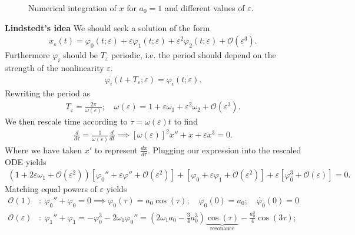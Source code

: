 \begin{ex}
\begin{figure}[h!]
	\caption{Numerical integration of $x$ for $a_0=1$ and different values of $\varepsilon$.}
	\label{fig:effect_nonlin_springboard}
\end{figure}

\noindent
\textbf{Lindstedt's idea} We should seek a solution of the form
\begin{align}
	x_{\varepsilon}(t) = \varphi_0(t;\varepsilon) + \varepsilon \varphi_1 (t;\varepsilon) + \varepsilon^2 \varphi_2(t;\varepsilon) + \mathcal{O}(\varepsilon^3).
\end{align}
Furthermore $\varphi_i$ should be $T_\varepsilon$ periodic, i.e. the period should depend on the strength of the  nonlinearity $\varepsilon$.
\begin{align}
	\varphi_i(t+T_\varepsilon; \varepsilon) = \varphi_i(t;\varepsilon).
\end{align}
Rewriting the period as
\begin{align}
	T_\varepsilon = \frac{2 \pi }{\omega(\varepsilon)}; \quad \omega(\varepsilon) = 1 + \varepsilon \omega_1 + \varepsilon^2 \omega_2 + \mathcal{O}(\varepsilon^3).
\end{align}
We then rescale time according to $\tau = \omega(\varepsilon) t$ to find
\begin{align}
	\frac{d}{d\tau} = \frac{1}{\omega(\varepsilon)} \frac{d}{dt} \implies 
	\boxed{[\omega(\varepsilon)]^2 x'' + x + \varepsilon x^3 = 0.}
\end{align}
Where we have taken $x'$ to represent $\frac{dx}{d\tau}$. Plugging our expression into the rescaled ODE yields
\begin{align}
	\left( 1 + 2 \varepsilon \omega_1 + \mathcal{O}(\varepsilon^2) \right) \left[ \varphi_0'' + \varepsilon \varphi'' + \mathcal{O}(\varepsilon^2) \right] + \left[ \varphi_0 + \varepsilon \varphi_1 + \mathcal{O}(\varepsilon^2) \right] + \varepsilon \left[\varphi_0^{3} + \mathcal{O}(\varepsilon) \right] = 0.
\end{align}
Matching equal powers of $\varepsilon$ yields
\begin{subequations}\begin{align}
	\mathcal{O}(1)&:\ \varphi_0'' + \varphi_0 = 0 \implies \varphi_0(\tau) = a_0 \cos(\tau);\quad \varphi_0(0)=a_0;\quad \dot{\varphi_0}(0) = 0 \\
	\mathcal{O}(\varepsilon)&:\ \varphi_1'' + \varphi_1 = - \varphi^3_0 - 2\omega_1 \varphi_{0}'' = 
	\left(2 \omega_1 a_0 - \frac{3}{4}a_0^{3}\right) \underbrace{\cos (\tau)}_{ \textrm{resonance} } - \frac{a_0^{3}}{4} \cos(3 \tau); \\

\end{align}
\end{subequations}
\end{ex}
